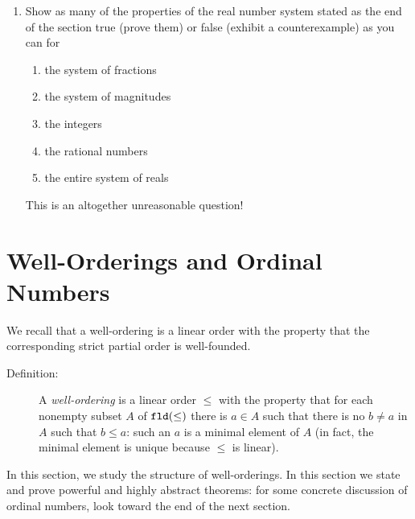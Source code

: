\documentclass[12pt]{book}
\begin{document}
\begin{enumerate}

\item  Show as many of the properties of the real number system stated as the end of the section true (prove them) or false (exhibit a counterexample) as you can
for

\begin{enumerate}

\item the system of fractions

\item the system of magnitudes

\item the integers

\item the rational numbers

\item the entire system of reals

\end{enumerate}

This is an altogether unreasonable question!

\end{enumerate}

\newpage


\section{Well-Orderings and  Ordinal Numbers}

We recall that a well-ordering is a linear order with the property
that the corresponding strict partial order is well-founded.

\begin{description}

\item[Definition:] A {\em well-ordering\/} is a linear
order $\leq$ with the property that for each nonempty subset $A$ of
${\tt fld}(\leq)$ there is $a \in A$ such that there is no $b\neq a$
in $A$ such that $b\leq a$: such an $a$ is a minimal element of $A$
(in fact, the minimal element is unique because $\leq$ is linear).

\end{description}

In this section, we study the structure of well-orderings.  In this
section we state and prove powerful and highly abstract theorems: for
some concrete discussion of ordinal numbers, look toward the end of
the next section.
\end{document}
